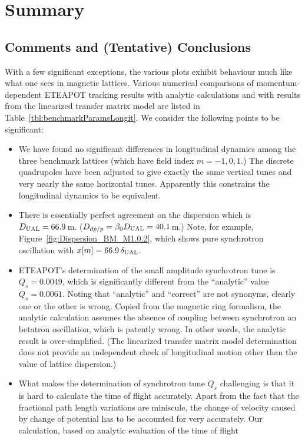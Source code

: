 \documentclass[]{article}
\begin{document}
\section{Summary}
\subsection{Comments and (Tentative) Conclusions}
With a few significant exceptions, the various plots exhibit 
behaviour much like what one sees in magnetic lattices.
Various numerical comparisons of momentum-dependent ETEAPOT tracking 
results with analytic calculations and with results from the linearized 
transfer matrix model are listed in Table~\ref{tbl:benchmarkParamsLongit}.
We consider the following points to be significant:
%
\begin{itemize}
\item
We have found no significant differences in longitudinal dynamics
among the three benchmark lattices (which have field index $m=-1,0,1$.)
The discrete quadrupoles have been adjusted to give exactly the
same vertical tunes and very nearly the same horizontal tunes. Apparently
this constrains the longitudinal dynamics to be equivalent.
\item
There is essentially perfect agreement on the dispersion
which is $D_{\rm UAL}=66.9\,$m. ($D_{dp/p}=\beta_0D_{\rm UAL}=40.1\,$m.)
Note, for example, Figure~\ref{fig:Dispersion_BM_M1.0.2}, which shows 
pure synchrotron oscillation with $x[m]=66.9\,\delta_{\rm UAL}$.
\item
ETEAPOT's determination of the small amplitude synchrotron tune 
is $Q_s=0.0049$, which is significantly different from the ``analytic''
value $Q_s=0.0061$. Noting that ``analytic'' and ``correct'' are not synonyms, 
clearly one or the other is wrong. Copied from the magnetic
ring formalism, the analytic calculation assumes the absence of coupling
between synchrotron an betatron oscillation, which is patently wrong.
In other words, the analytic result is over-simplified. (The linearized
transfer matrix model determination does not provide an independent 
check of longitudinal motion other than the value of lattice dispersion.)
\item
What makes the determination of synchrotron tune $Q_s$ challenging is that 
it is hard to calculate
the time of flight accurately.  Apart from the fact that the fractional
path length variations are miniscule, the change of velocity caused by
change of potential has to be accounted for very accurately. Our
calculation, based on analytic evaluation of the time of flight

\end{itemize}
\end{document}
